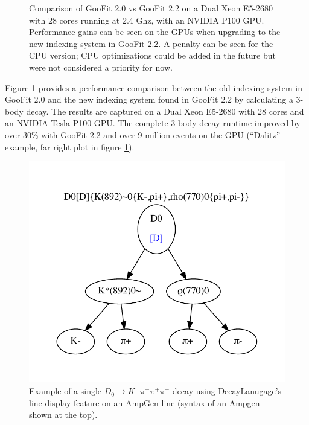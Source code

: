 \documentclass{webofc}
\begin{document}
\begin{figure}[h]
	\centering
	\caption{Comparison of GooFit 2.0 vs GooFit 2.2 on a Dual Xeon E5-2680 with 28 cores running at 2.4 Ghz, with an NVIDIA P100 GPU. Performance gains can be seen on the GPUs when upgrading to the new indexing system in GooFit 2.2. A penalty can be seen for the CPU version; CPU optimizations could be added in the future but were not considered a priority for now.}
		\label{figure-newindexspeed}
\end{figure}

Figure \ref{figure-newindexspeed} provides a performance comparison between the old indexing system in GooFit 2.0 and the new indexing system found in GooFit 2.2 by calculating a 3-body decay. The results are captured on a Dual Xeon E5-2680 with 28 cores and an NVIDIA Tesla P100 GPU. The complete 3-body decay runtime improved by over 30\% with GooFit 2.2 and over 9 million events on the GPU (``Dalitz'' example, far right plot in figure \ref{figure-newindexspeed}).

\begin{figure}[ht]
	\centering
	\includegraphics[width=.5\textwidth]{LineExample}
	\caption{Example of a single $D_0 \rightarrow K^{-} \pi^{+} \pi^{+} \pi^{-}$ decay using DecayLanugage's line display feature on an AmpGen line (syntax of an Ampgen shown at the top).}
		\label{fig-ampgen}
\end{figure}
\end{document}
